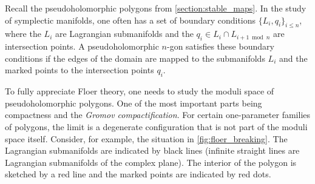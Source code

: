     Recall the pseudoholomorphic polygons from \cref{section:stable_maps}. In the study of symplectic manifolds, one often has a set of boundary conditions $\{L_i,q_i\}_{i\leq n}$, where the $L_i$ are Lagrangian submanifolds and the $q_i\in L_i\cap L_{i+1\bmod n}$ are intersection points. A pseudoholomorphic $n$-gon satisfies these boundary conditions if the edges of the domain are mapped to the submanifolds $L_i$ and the marked points to the intersection points $q_i$.

    \begin{property}
        To fully appreciate Floer theory, one needs to study the moduli space of pseudoholomorphic polygons. One of the most important parts being compactness and the \textit{Gromov compactification}. For certain one-parameter families of polygons, the limit is a degenerate configuration that is not part of the moduli space itself. Consider, for example, the situation in \cref{fig:floer_breaking}. The Lagrangian submanifolds are indicated by black lines (infinite straight lines are Lagrangian submanifolds of the complex plane). The interior of the polygon is sketched by a red line and the marked points are indicated by red dots.


\end{property}
